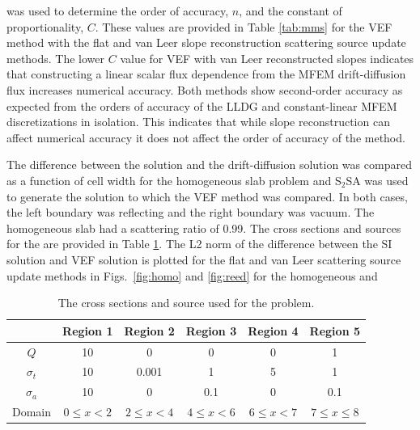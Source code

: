 was used to determine the order of accuracy, $n$, and the constant of proportionality, $C$. These values are provided in Table \ref{tab:mms} for the VEF method with the flat and van Leer slope reconstruction scattering source update methods. 
 The lower $C$ value for VEF with van Leer reconstructed slopes indicates that constructing a linear scalar flux dependence from the MFEM drift-diffusion flux increases numerical accuracy. Both methods show second-order accuracy as expected from the orders of accuracy of the LLDG and constant-linear MFEM discretizations in isolation. This indicates that while slope reconstruction can affect numerical 
 accuracy it does not affect the order of accuracy of the method.
	\begin{table}[htb]
	\centering
	\caption{The order of accuracy, error, and $R^2$ values for flat and van Leer slope reconstruction scattering source update methods. }
	\label{tab:mms}
	\end{table}
	
The difference between the \SN solution and the drift-diffusion solution was compared as a function of cell width for the homogeneous slab problem and  S$_2$SA was used to generate the \SN solution to which the VEF method was compared. In both cases, the left boundary was reflecting and the right boundary was vacuum. The homogeneous slab had a scattering ratio of 0.99. The cross sections and sources for the  are provided in Table \ref{tab:reedXS}. The L2 norm of the difference between the SI solution and VEF solution is plotted for the flat and van Leer scattering source update methods in Figs.~\ref{fig:homo} and \ref{fig:reed} for the homogeneous and 

	\begin{table}[htb]
	 \centering
		\begin{tabular}{|c|c|c|c|c|c|}
			\hline
			& Region 1 & Region 2 & Region 3 & Region 4 & Region 5 \\ 
			\hline 
			$Q$ & 10 & 0 & 0 & 0 & 1 \\ 
			$\sigma_t$ & 10 & 0.001 & 1 & 5 & 1 \\ 
			$\sigma_a$ & 10 & 0 & 0.1 & 0 & 0.1 \\ 
			\hline 
			Domain & $0 \leq x < 2$ & $2 \leq x < 4$ & $4\leq x < 6$ &
				$6 \leq x < 7$ & $7 \leq x \leq 8$\\ 
			\hline 
		\end{tabular}
		\caption{The cross sections and source used for the  problem.}
		\label{tab:reedXS}
	\end{table}

